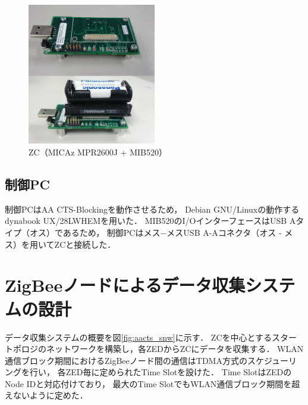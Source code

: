 \documentclass[12pt]{jreport}
\begin{document}
\begin{figure}[bt]
 \centering
 \includegraphics[width=0.5\textwidth]{figure/zc.pdf}
 \caption{ZC（MICAz MPR2600J + MIB520）}
 \label{fig:zc}
\end{figure}

\subsection{制御PC}


制御PCはAA CTS-Blockingを動作させるため，
Debian GNU/Linuxの動作するdynabook UX/28LWHEMを用いた．
MIB520のI/OインターフェースはUSB Aタイプ（オス）であるため，
制御PCはメス−メスUSB A-Aコネクタ（オス - メス）を用いてZCと接続した．

\section{ZigBeeノードによるデータ収集システムの設計}
\label{sec:collecting_system}

データ収集システムの概要を図\ref{fig:aacts_snw}に示す．
ZCを中心とするスタートポロジのネットワークを構築し，各ZEDからZCにデータを収集する．
WLAN通信ブロック期間におけるZigBeeノード間の通信はTDMA方式のスケジューリングを行い，
各ZED毎に定められたTime Slotを設けた．
Time SlotはZEDのNode IDと対応付けており，
最大のTime SlotでもWLAN通信ブロック期間を超えないように定めた．
\end{document}
